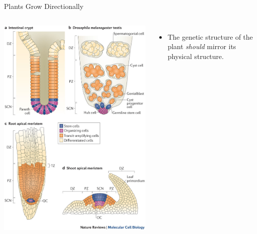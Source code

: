 \documentclass{beamer}
\begin{document}
\begin{frame}{Plants Grow Directionally}
\begin{columns}
		\includegraphics[trim={12cm 2cm 0 22cm},clip,width=\linewidth]{stemcells.jpg}
		\begin{itemize}
			\item The genetic structure of the plant \textit{should} mirror its physical structure.
		\end{itemize}
\end{columns}
\end{frame}
\end{document}

